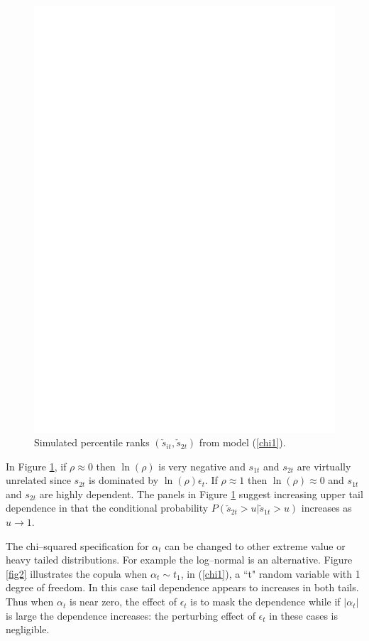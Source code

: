 \documentclass[a4paper,12pt]{article}
\newcommand{\eps}{\epsilon}
\newcommand{\fref}[1]{Figure \ref{#1}}
\begin{document}
\begin{figure}[htb]
\centering
\includegraphics{fig1.eps}
\caption{Simulated percentile ranks $(\check s_{it},\check s_{2t})$ from model (\ref{chi1}).} \label{fig1}
\end{figure}

In \fref{fig1}, if $\rho\approx 0$ then $\ln(\rho)$ is very negative and $s_{1t}$ and $s_{2t}$ are virtually unrelated since $s_{2t}$ is dominated by $\ln(\rho)\eps_t$.  If $\rho\approx 1$ then $\ln(\rho)\approx 0$ and $s_{1t}$ and $s_{2t}$ are highly dependent.  The panels in \fref{fig1} suggest increasing upper tail dependence in that the conditional probability $P(\check s_{2t}> u|\check s_{1t}>u)$ increases as $u\rightarrow 1$.

The chi--squared specification for $\alpha_t$ can be changed to other extreme value or heavy tailed distributions. For example the log--normal is an alternative.  \fref{fig2} illustrates the copula when $\alpha_t\sim t_1$, in (\ref{chi1}), a ``t"  random variable with 1 degree of freedom.  In this case tail dependence appears to increases in both tails. Thus when $\alpha_t$ is near zero, the effect of $\eps_t$ is to mask the dependence while if $|\alpha_t|$ is large the dependence increases: the perturbing effect of $\eps_t$ in these cases is negligible.
\end{document}
